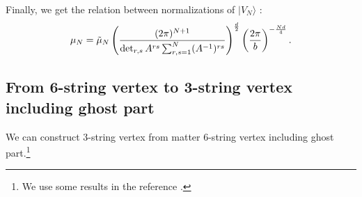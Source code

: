 \documentclass[12pt,a4paper]{article}
\begin{document}
Finally, we get the relation between normalizations of $|V_N\rangle$ :
\begin{equation}
\mu_N={\tilde \mu}_N \left({(2\pi)^{N+1}\over\det_{r,s}A^{rs} \sum_{r,s=1}^N (A^{-1})^{rs}}\right)^{d\over2}\left({2\pi\over b}\right)^{-{N d\over4}}.
\end{equation}

\subsection{From 6-string vertex to 3-string vertex including ghost part}

We can construct 3-string vertex from matter 6-string vertex including ghost part.\footnote{
	We use some results in the reference \cite{IOS}.
}
\end{document}

